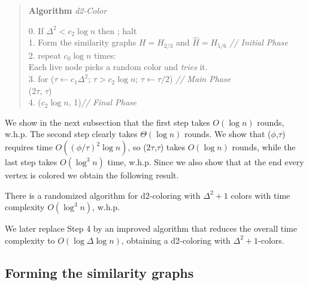 \begin{quote}
   \textbf{Algorithm} \emph{d2-Color}

   0. If $\Delta^2 < c_2 \log n$ then ; halt \\
   1. Form the similarity graphs $H=H_{2/3}$ and $\hat{H} = H_{5/6}$  \hspace{1cm }\textit{// Initial Phase} \\
   2. repeat $c_0 \log n$ times: \\
   \hspace*{2em} Each live node picks a random color and \emph{tries} it. \\
   3. for ($\tau \leftarrow c_1 \Delta^2$; $\tau > c_2 \log n$; $\tau \leftarrow \tau/2$) \hspace{3.5cm }\textit{// Main Phase}\\
\hspace*{2em}      ($2 \tau$, $\tau$) \\
    4. ($c_2 \log n$, 1)\hspace{6.75cm}\textit{// Final Phase}
\end{quote}

 
We show in the next subsection that the first step takes $O(\log n)$ rounds, w.h.p.
The second step clearly takes $\Theta(\log n)$ rounds.
We show that ($\phi$,$\tau$) requires time $O((\phi/\tau)^2\log n)$, so ($2\tau$,$\tau$) takes $O(\log n)$ rounds, while the last step takes $O(\log^3 n)$ time, w.h.p. Since we also show that at the end every vertex is colored we obtain the following result.

\begin{corollary}
  There is a randomized {\congest} algorithm for d2-coloring with $\Delta^2+1$ colors with time complexity $O(\log^3 n)$, w.h.p.
  \label{C:first-rand-result}
\end{corollary}

We later replace Step 4 by an improved algorithm that reduces the overall time complexity to $O(\log \Delta \log n)$, obtaining a d2-coloring with $\Delta^2+1$-colors.


\subsection{Forming the similarity graphs} 

